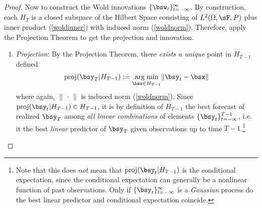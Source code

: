 \documentclass[12pt]{article}
\theoremstyle{plain}
\theoremstyle{definition}
\theoremstyle{remark}
\DeclareMathOperator*{\argmin}{arg\;min}
\newcommand{\proj}{\operatorname{proj}}
\newcommand{\tinfinf}{_{t=-\infty}^\infty}
\begin{document}
\begin{proof}
Now to construct the Wold innovations $\{\bsw_t\}\tinfinf$. By
construction, each $H_T$ is a closed subspace of the Hilbert Space
consisting of $L^2(\Omega,\sF,P)$ plus inner product (\ref{woldinner})
with induced norm (\ref{woldnorm}). Therefore, apply the Projection
Theorem to get the projection and innovation.
\begin{enumerate}[label=(\roman*)]
  \item
    \emph{Projection}:
    By the Projection Theorem, there \emph{exists a unique} point in
    $H_{T-1}$ defined
    \begin{align*}
      \proj(\bsy_T|H_{T-1})
      := \argmin_{\bsx\in H_{T-1}} \lVert \bsy_t-\bsx\rVert
    \end{align*}
    where again, $\lVert \,\cdot\,\rVert$ is induced norm (\ref{woldnorm}).
    Since $\proj(\bsy_t|H_{T-1})\in H_{T-1}$, it is by definition of
    $H_{T-1}$ the best forecast of realized $\bsy_T$ among \emph{all linear
    combinations} of elements $\{\bsy_t\}_{t=-\infty}^{T-1}$, i.e. it the
    best \emph{linear} predictor of $\bsy_T$ given observations up to time
    $T-1$.\footnote{%
      Note that this does \emph{not} mean that $\proj(\bsy_t|H_{T-1})$ is
      the conditional expectation, since the conditional expectation can
      generally be a nonlinear function of past observations.  Only if
      $\{\bsy_t\}\tinfinf$ is a \emph{Gaussian} process do the best linear
      predictor and conditional expectation coincide.
    }


\end{enumerate}
\end{proof}
\end{document}
